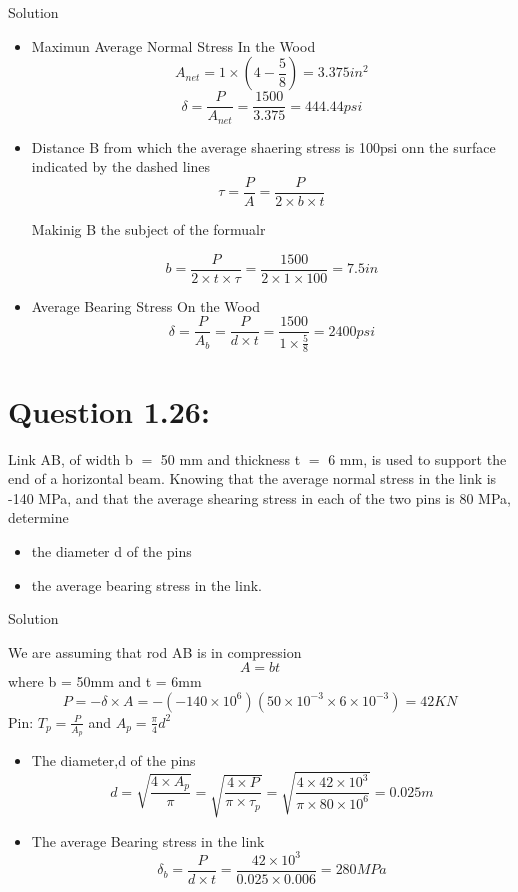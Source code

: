 \documentclass{article}
\begin{document}
\begin{center} Solution\end{center}
\begin{itemize}
\item Maximun Average Normal Stress In the Wood
\[ A_{net} = 1\times(4-\frac{5}{8}) = 3.375in^{2}\]
\[\delta = \frac{P}{A_{net}} = \frac{1500}{3.375} = 444.44psi\]
\item  Distance B from which the average shaering stress is 100psi onn the surface indicated by the dashed lines
\[\tau = \frac{P}{A} = \frac{P}{2\times b\times t}\]
\begin{center}Makinig B the subject of the formualr \end{center}
\[b = \frac{P}{2\times t\times\tau} = \frac{1500}{2\times 1\times100} = 7.5in\]
\item Average Bearing Stress On the Wood
\[\delta = \frac{P}{A_{b}} = \frac{P}{d\times t}=\frac{1500}{1\times\frac{5}{8}} =2400psi\]
\end{itemize}


\section*{\textbf{Question 1.26:}}
Link AB, of width b $=$ 50 mm and thickness t $=$ 6 mm, is used to support the end of a horizontal beam. Knowing that the average normal stress in the link is -140 MPa, and that the average shearing stress in each of the two pins is 80 MPa, determine 
\begin{itemize}
	\item the diameter d of the pins
	\item the average bearing stress in the link.
\end{itemize}

\begin{center} Solution \end{center}
We are assuming that rod AB is in compression
\[A = bt\]
where b = 50mm and t = 6mm
\[P = -\delta \times A = -(-140 \times 10^{6})(50 \times 10^{-3} \times 6 \times 10^{-3}) = 42KN\]
Pin: $ T_{p} = \frac{P}{A_{p}} $ and $A_{p} = \frac{\pi}{4}d^{2}$
\begin{itemize}
\item The diameter,d of the pins
\[d = \sqrt{\frac{4\times A_{p}}{\pi}} = \sqrt{\frac{4\times P}{\pi\times\tau_{p}}} = \sqrt{\frac{4\times 42 \times 10^{3}}{\pi \times 80 \times 10^{6}}} = 0.025m\]
\item The average Bearing stress in the link
\[\delta_{b} = \frac{P}{d\times t} = \frac{42\times10^{3}}{0.025\times0.006} = 280MPa\]
\end{itemize}
\end{document}
